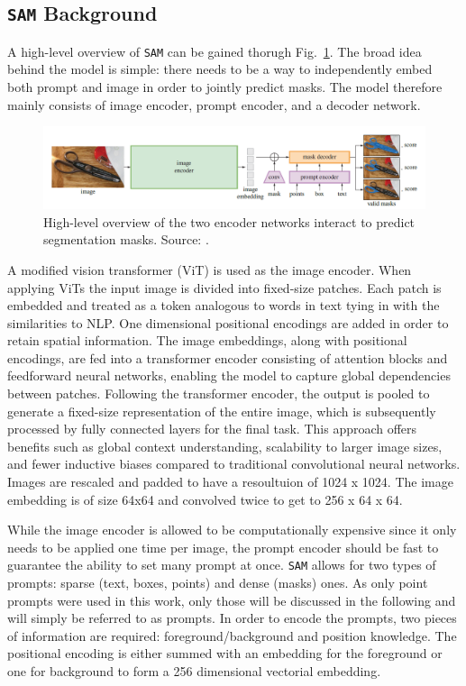 \subsection{\texttt{SAM} Background}\label{SAMbg}
A high-level overview of \texttt{SAM} can be gained thorugh Fig.~\ref{figsamoverview}. The broad idea behind the model is simple: there needs to be a way to independently embed both prompt and image in order to jointly predict masks. The model therefore mainly consists of image encoder, prompt encoder, and a decoder network.
\begin{figure}
	\centering
	\includegraphics[width=\textwidth]{"images/sam_overview.png"}
	\caption[\texttt{SAM} Overview]{High-level overview of the two encoder networks interact to predict segmentation masks. Source: \cite{kirillov2023segment}.}
	\label{figsamoverview}
\end{figure}
A modified vision transformer \cite{dosovitskiy2020image} (ViT) is used as the image encoder. When applying ViTs the input image is divided into fixed-size patches. Each patch is embedded and treated as a token analogous to words in text tying in with the similarities to NLP. One dimensional positional encodings are added in order to retain spatial information. The image embeddings, along with positional encodings, are fed into a transformer encoder \cite{vaswani2017attention} consisting of attention blocks and feedforward neural networks, enabling the model to capture global dependencies between patches. Following the transformer encoder, the output is pooled to generate a fixed-size representation of the entire image, which is subsequently processed by fully connected layers for the final task. This approach offers benefits such as global context understanding, scalability to larger image sizes, and fewer inductive biases compared to traditional convolutional neural networks. Images are rescaled and padded to have a resoultuion of 1024 x 1024. The image embedding is of size 64x64 and convolved twice to get to 256 x 64 x 64.

While the image encoder is allowed to be computationally expensive since it only needs to be applied one time per image, the prompt encoder should be fast to guarantee the ability to set many prompt at once. \texttt{SAM} allows for two types of prompts: sparse (text, boxes, points) and dense (masks) ones. As only point prompts were used in this work, only those will be discussed in the following and will simply be referred to as prompts. In order to encode the prompts, two pieces of information are required: foreground/background and position knowledge. The positional encoding is either summed with an embedding for the foreground or one for background to form a 256 dimensional vectorial embedding.

